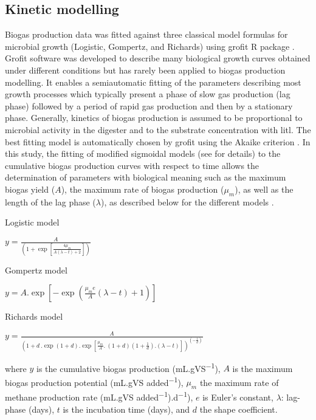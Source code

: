 \subsection{Kinetic modelling}
Biogas production data was fitted against three classical model formulas for microbial growth (Logistic, Gompertz, and Richards) using grofit R package \cite{Kahm_2010}. Grofit software was developed to describe many biological growth curves obtained under different conditions but has rarely been applied to biogas production modelling. It enables a semiautomatic fitting of the parameters describing most growth processes which typically present a phase of slow gas production (lag phase) followed by a period of rapid gas production and then by a stationary phase. Generally, kinetics of biogas production is assumed to be proportional to microbial activity in the digester and to the substrate concentration with litl. The best fitting model is automatically chosen by grofit using the Akaike criterion \cite{Hasenbrink_2006}. In this study, the fitting of modified sigmoidal models (see \cite{Zwietering1990} for details) to the cumulative biogas production curves with respect to time allows the determination of parameters with biological meaning such as the maximum biogas yield ($A$), the maximum rate of biogas production ($μ_m$), as well as the length of the lag phase ($λ$), as described below for the different models \cite{Zwietering1990,Ware_2017,Alta__2009}.

Logistic model

\(y=\frac{A}{\left(1+\exp\left[\frac{4\mu_m}{A\left(\lambda-t\right)+2}\right]\right)}\)

Gompertz model

\(y=A.\exp\left[-\exp\left(\frac{\mu_me}{A}\left(\lambda-t\right)+1\right)\right]\)

Richards model

\(y=\frac{A}{\left(1+d\ .\exp\left(1+d\right).\exp\left[\frac{\mu_m}{A}.\ \left(1+d\right)\left(1+\frac{1}{d}\right).\left(\lambda-t\right)\right]\right)^{\left(-\frac{1}{d}\right)}}\)


where $y$ is the cumulative biogas production (mL.gVS\textsuperscript{−1}), $A$ is the maximum biogas production potential (mL.gVS added\textsuperscript{−1}), $μ_m$ the maximum rate of methane production rate (mL.gVS added\textsuperscript{−1}).d\textsuperscript{−1}), $e$ is Euler's constant, $λ$: lag-phase (days), $t$ is the incubation time (days), and $d$ the shape coefficient.